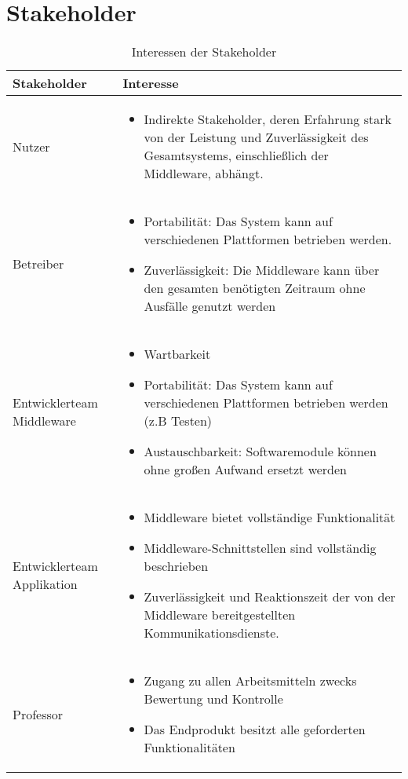 \section{Stakeholder}
\begin{table}[h!]
	\caption{Interessen der Stakeholder}
	\label{tab:stakeholder}
	\centering
	\begin{tabular}{|p{2.5cm}|p{10cm}|}
		\hline
		\textbf{Stakeholder} & \textbf{Interesse}  \\
		\hline
		Nutzer   
		& \parbox{10cm}{\begin{itemize}
				\item  Indirekte Stakeholder, deren Erfahrung stark von der Leistung und Zuverlässigkeit des Gesamtsystems, einschließlich der Middleware, abhängt.
		\end{itemize}}
		\\
		\hline
		Betreiber 
		&\parbox{10cm}{\begin{itemize}
				\item Portabilität: Das System kann auf verschiedenen Plattformen betrieben werden.
				\item Zuverlässigkeit: Die Middleware kann über den gesamten benötigten Zeitraum ohne Ausfälle genutzt werden
		\end{itemize}}
		\\
		\hline
		Entwicklerteam Middleware
		&\parbox{10cm}{ \begin{itemize}
				\item Wartbarkeit
				\item Portabilität: Das System kann auf verschiedenen Plattformen betrieben werden (z.B Testen)
				\item Austauschbarkeit: Softwaremodule können ohne großen Aufwand ersetzt werden
		\end{itemize}}
		\\
		\hline
		Entwicklerteam Applikation
		&\parbox{10cm}{ \begin{itemize}
				\item Middleware bietet vollständige Funktionalität
				\item Middleware-Schnittstellen sind vollständig beschrieben
				\item Zuverlässigkeit und Reaktionszeit der von der Middleware bereitgestellten Kommunikationsdienste.
		\end{itemize}}
		\\
		\hline
		
		Professor & \parbox{10cm}{\begin{itemize}
				\item Zugang zu allen Arbeitsmitteln zwecks Bewertung und Kontrolle
				\item Das Endprodukt besitzt alle geforderten Funktionalitäten
		\end{itemize}}
		\\
		\hline
	\end{tabular}
\end{table}